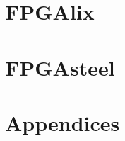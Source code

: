 \documentclass[a4paper,12pt]{book}
\begin{document}




\part{FPGAlix}\label{part:fpgalix}


\part{FPGAsteel}\label{part:fpgasteel}


\appendix
\part{Appendices}\label{part:appendices}

\end{document}
